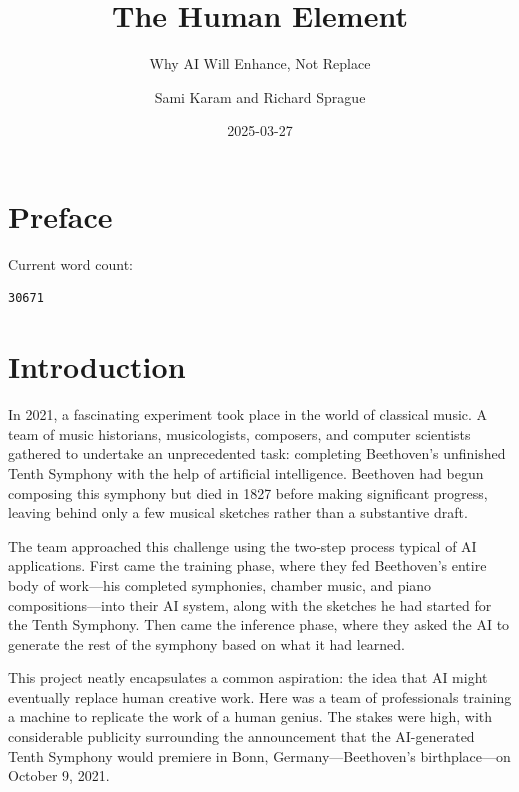 \documentclass[
  Letterpaper,
]{scrbook}
\title{The Human Element}
\subtitle{Why AI Will Enhance, Not Replace}
\author{Sami Karam and Richard Sprague}
\date{2025-03-27}
\renewcommand*\contentsname{Table of contents}
\newcommand\contentsname{Table of contents}
\begin{document}
\frontmatter
\maketitle

\renewcommand*\contentsname{Table of contents}
{
\setcounter{tocdepth}{2}
\tableofcontents
}

\mainmatter
{}

\chapter*{Preface}\label{preface}


Current word count:

\begin{verbatim}
30671
\end{verbatim}


\chapter*{Introduction}\label{introduction}


In 2021, a fascinating experiment took place in the world of classical
music. A team of music historians, musicologists, composers, and
computer scientists gathered to undertake an unprecedented task:
completing Beethoven's unfinished Tenth Symphony with the help of
artificial intelligence. Beethoven had begun composing this symphony but
died in 1827 before making significant progress, leaving behind only a
few musical sketches rather than a substantive draft.

The team approached this challenge using the two-step process typical of
AI applications. First came the training phase, where they fed
Beethoven's entire body of work---his completed symphonies, chamber
music, and piano compositions---into their AI system, along with the
sketches he had started for the Tenth Symphony. Then came the inference
phase, where they asked the AI to generate the rest of the symphony
based on what it had learned.

This project neatly encapsulates a common aspiration: the idea that AI
might eventually replace human creative work. Here was a team of
professionals training a machine to replicate the work of a human
genius. The stakes were high, with considerable publicity surrounding
the announcement that the AI-generated Tenth Symphony would premiere in
Bonn, Germany---Beethoven's birthplace---on October 9, 2021.
\end{document}
